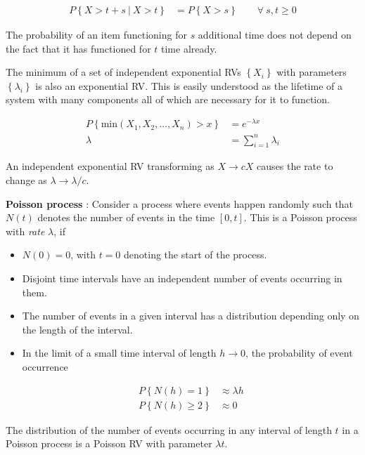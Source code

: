 \begin{align}
	P \left\{X > t+s\ |\ X > t \right\} &= P \left\{X > s \right\} \qquad \forall \ s, t\geq 0
\end{align}

The probability of an item functioning for $ s $ additional time does not depend on the fact that it has functioned for $ t $ time already.

The minimum of a set of independent exponential RVs $ \left\{X_i\right\} $ with parameters $ \left\{\lambda_i\right\} $ is also an exponential RV. This is easily understood as the lifetime of a system with many components all of which are necessary for it to function.

\begin{align}
	P \left\{\mathrm{min}(X_1, X_2, \dots, X_n) > x\right\} &= e^{-\lambda x} \nonumber \\
	\lambda &= \sum_{i=1}^{n} \lambda_i
\end{align}

An independent exponential RV transforming as $ X \to cX $ causes the rate to change as $ \lambda \to \lambda/c $.

\textbf{Poisson process} : Consider a process where events happen randomly such that $ N(t) $ denotes the number of events in the time $ [0, t] $. This is a Poisson process with \textit{rate} $ \lambda $, if

\begin{itemize}
	\item $ N(0) = 0 $, with $ t = 0 $ denoting the start of the process.
	
	\item Disjoint time intervals have an independent number of events occurring in them.
	
	\item The number of events in a given interval has a distribution depending only on the length of the interval.
	
	\item In the limit of a small time interval of length $ h \to 0 $, the probability of event occurrence
	
	\begin{align}
		P \left\{N(h) = 1\right\} &\approx \lambda h \nonumber \\
		P \left\{N(h) \geq 2\right\} &\approx 0
	\end{align}
\end{itemize}

The distribution of the number of events occurring in any interval of length $ t $ in a Poisson process is a Poisson RV with parameter $ \lambda t $.

